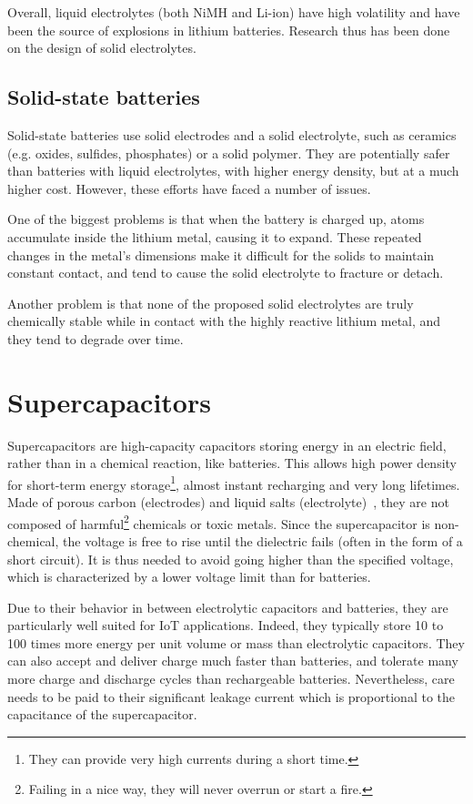 \documentclass{EPL-master-thesis-covers-EN}
\begin{document}
Overall, liquid electrolytes (both NiMH and Li-ion) have high volatility and have been the source of explosions in lithium batteries. Research thus has been done on the design of solid electrolytes.

\subsection*{Solid-state batteries}

Solid-state batteries use solid electrodes and a solid electrolyte, such as ceramics (e.g. oxides, sulfides, phosphates) or a solid polymer. They are potentially safer than batteries with liquid electrolytes, with higher energy density, but at a much higher cost.
However, these efforts have faced a number of issues.

One of the biggest problems is that when the battery is charged up, atoms accumulate inside the lithium metal, causing it to expand. These repeated changes in the metal’s dimensions make it difficult for the solids to maintain constant contact, and tend to cause the solid electrolyte to fracture or detach.

Another problem is that none of the proposed solid electrolytes are truly chemically stable while in contact with the highly reactive lithium metal, and they tend to degrade over time.

\section{Supercapacitors}

Supercapacitors are high-capacity capacitors storing energy in an electric field, rather than in a chemical reaction, like batteries. This allows high power density for short-term energy storage\footnote{They can provide very high currents during a short time.}, almost instant recharging and very long lifetimes. Made of porous carbon (electrodes) and liquid salts (electrolyte)~\cite{BAPTISTA20191153}, they are not composed of harmful\footnote{Failing in a nice way, they will never overrun or start a fire.} chemicals or toxic metals.
Since the supercapacitor is non-chemical, the voltage is free to rise until the dielectric fails (often in the form of a short circuit). It is thus needed to avoid going higher than the specified voltage, which is characterized by a lower voltage limit than for batteries.

Due to their behavior in between electrolytic capacitors and batteries, they are particularly well suited for IoT applications. Indeed, they typically store 10 to 100 times more energy per unit volume or mass than electrolytic capacitors. They can also accept and deliver charge much faster than batteries, and tolerate many more charge and discharge cycles than rechargeable batteries. Nevertheless, care needs to be paid to their significant leakage current which is proportional to the capacitance of the supercapacitor.
\end{document}
